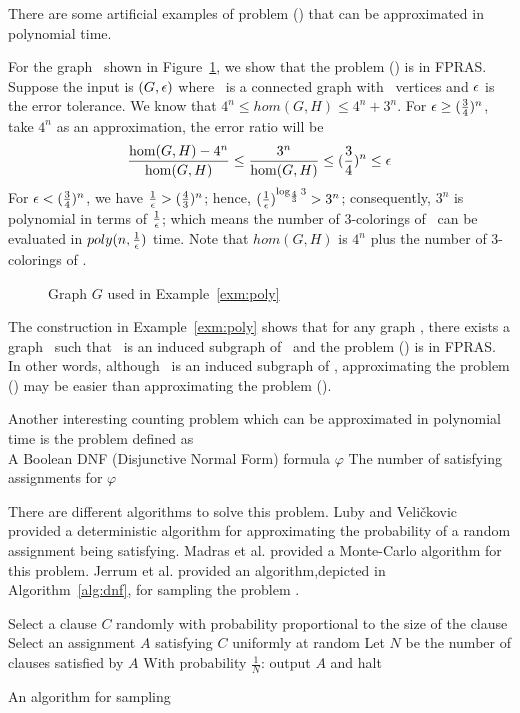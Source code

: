 There are some artificial examples of problem \ccsp(\mrelset) that can be approximated 
in polynomial time. 

\begin{example} \label{exm:poly}
For the graph \mH\ shown in Figure~\ref{fig:approxible},
we show that the problem \chom(\mH) is in FPRAS\@. Suppose the input is 
\((G,\epsilon)\) where \mG\ is a connected graph with \mn\ vertices and \(\epsilon\)
is the error tolerance.
We know that 
\(4^n\le hom(G,H) \le 4^n+3^n\)\@.
For \(\epsilon \ge (\frac{3}{4})^n\), take \(4^n\) as an approximation, the error ratio will  be
\[\frac{\hom(G,H)-4^n}{\hom(G,H)} \le \frac{3^n}{\hom(G,H)} \le (\frac{3}{4})^n \le \epsilon\]
For \(\epsilon < (\frac{3}{4})^n\), we have \(\frac{1}{\epsilon}>(\frac{4}{3})^n \);
hence, \((\frac{1}{\epsilon})^{\log_{\frac{4}{3}}3} > 3^n\); consequently, \(3^n\) is polynomial 
in terms of \(\frac{1}{\epsilon}\); which means the number of 3-colorings of \mG\ can be evaluated in 
\(poly(n,\frac{1}{\epsilon})\) time. 
Note that \(hom(G,H)\) is \(4^n\) plus the number of 3-colorings of \mG\@.

\begin{figure}[h] 
\center
\caption{Graph \ensuremath{G} used in Example~\ref{exm:poly}}
\label{fig:approxible}
\end{figure}
\end{example}

The construction in Example~\ref{exm:poly} shows that for any graph \mG,
there exists a graph \mH\ such that \mG\
is an induced subgraph of \mH\ and the problem \chom(\mH) is in FPRAS\@.
In other words, although \mG\ is an induced subgraph of \mH, approximating
the problem \chom(\mH)
may be easier than approximating the problem \chom(\mG)\@.

Another interesting counting problem which can be approximated in polynomial time is 
the problem \pname{\#DNF-SAT} defined as\\
\pnndef %
{A Boolean DNF (Disjunctive Normal Form) formula \(\varphi\)}
{The number of satisfying assignments for \(\varphi\)}

There are different algorithms to solve this problem.
Luby and Veli\v{c}kovic \cite{Luby} provided a deterministic algorithm for
approximating the probability of a random assignment being satisfying. 
Madras et al. \cite{Madras} provided a Monte-Carlo algorithm
for this problem. Jerrum et al. \cite{JVV} provided an algorithm,depicted in Algorithm~\ref{alg:dnf},
for sampling the problem \pname{DNF-SAT}. 
\begin{algorithm}[h]
\begin{algorithmic}
       \STATE Select a clause \(C\) randomly with probability proportional to the size of the clause
       \STATE Select an assignment \(A\) satisfying \(C\) uniformly at random
       \STATE Let \(N\) be the number of clauses satisfied by \(A\)
       \STATE With probability \(\frac{1}{N}\): output \(A\) and halt
\ENDWHILE
\end{algorithmic}
\caption{An algorithm for sampling }\label{alg:dnf}
\end{algorithm}

